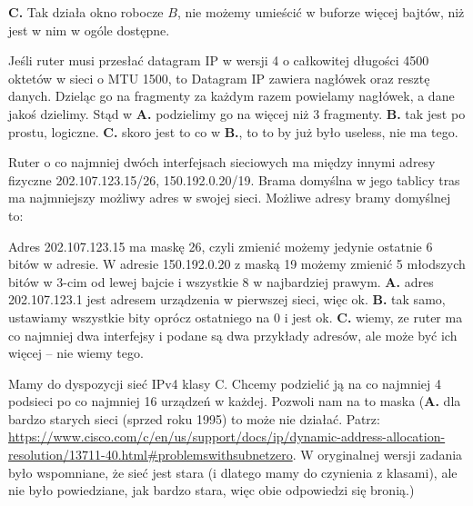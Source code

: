 \begin{solutions}
    \textbf{C.} Tak działa okno robocze $B$, nie możemy umieścić w buforze więcej bajtów, niż jest w nim w ogóle dostępne.

    \sol Jeśli ruter musi przesłać datagram IP w wersji 4 o całkowitej długości 4500 oktetów w sieci o MTU 1500, to
    Datagram IP zawiera nagłówek oraz resztę danych. Dzieląc go na fragmenty za każdym razem powielamy nagłówek, a dane jakoś dzielimy. Stąd w \textbf{A.} podzielimy go na więcej niż 3 fragmenty. \textbf{B.} tak jest po prostu, logiczne. \textbf{C.} skoro jest to co w \textbf{B.}, to to by już było useless, nie ma tego.

    \sol Ruter o co najmniej dwóch interfejsach sieciowych ma między innymi adresy fizyczne 202.107.123.15/26, 150.192.0.20/19. Brama domyślna w jego tablicy tras ma najmniejszy możliwy adres w swojej sieci. Możliwe adresy bramy domyślnej to:

    Adres 202.107.123.15 ma maskę 26, czyli zmienić możemy jedynie ostatnie 6 bitów w adresie. W adresie 150.192.0.20 z maską 19 możemy zmienić 5 młodszych bitów w 3-cim od lewej bajcie i wszystkie 8 w najbardziej prawym. \textbf{A.} adres 202.107.123.1 jest adresem urządzenia w pierwszej sieci, więc ok. \textbf{B.} tak samo, ustawiamy wszystkie bity oprócz ostatniego na 0 i jest ok. \textbf{C.} wiemy, ze ruter ma co najmniej dwa interfejsy i podane są dwa przykłady adresów, ale może być ich więcej -- nie wiemy tego.

    \sol Mamy do dyspozycji sieć IPv4 klasy C. Chcemy podzielić ją na co najmniej 4 podsieci po co najmniej 16 urządzeń w każdej. Pozwoli nam na to maska
    (\textbf{A.} dla bardzo starych sieci (sprzed roku 1995) to może nie działać. Patrz: \url{https://www.cisco.com/c/en/us/support/docs/ip/dynamic-address-allocation-resolution/13711-40.html#problemswithsubnetzero}. W oryginalnej wersji zadania było wspomniane, że sieć jest stara (i dlatego mamy do czynienia z klasami), ale nie było powiedziane, jak bardzo stara, więc obie odpowiedzi się bronią.)

    \textbf{}


\end{solutions}
